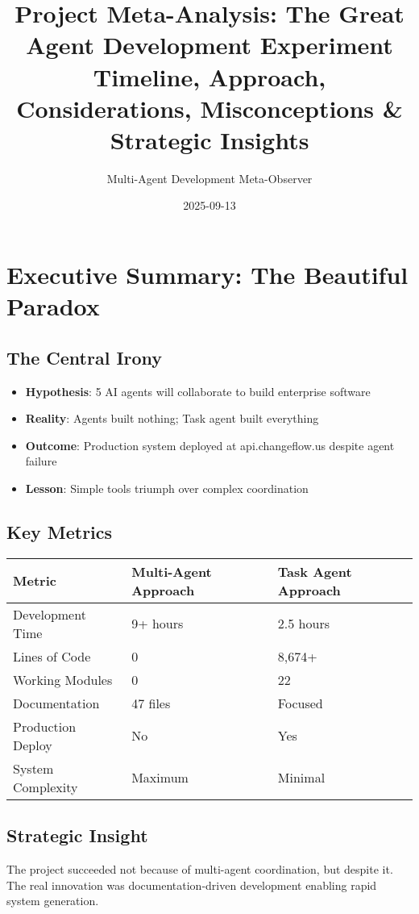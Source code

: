 \documentclass[11pt]{article}
\author{Multi-Agent Development Meta-Observer}
\date{2025-09-13}
\title{Project Meta-Analysis: The Great Agent Development Experiment\\\medskip
\large Timeline, Approach, Considerations, Misconceptions \& Strategic Insights}
\begin{document}
\maketitle
\tableofcontents

\section{Executive Summary: The Beautiful Paradox}
\label{sec:org606e2f9}

\subsection{The Central Irony}
\label{sec:org1a980ad}
\begin{itemize}
\item \textbf{\textbf{Hypothesis}}: 5 AI agents will collaborate to build enterprise software
\item \textbf{\textbf{Reality}}: Agents built nothing; Task agent built everything
\item \textbf{\textbf{Outcome}}: Production system deployed at api.changeflow.us despite agent failure
\item \textbf{\textbf{Lesson}}: Simple tools triumph over complex coordination
\end{itemize}
\subsection{Key Metrics}
\label{sec:org3f25f1b}
\begin{center}
\begin{tabular}{lll}
Metric & Multi-Agent Approach & Task Agent Approach\\
\hline
Development Time & 9+ hours & 2.5 hours\\
Lines of Code & 0 & 8,674+\\
Working Modules & 0 & 22\\
Documentation & 47 files & Focused\\
Production Deploy & No & Yes\\
System Complexity & Maximum & Minimal\\
\end{tabular}
\end{center}
\subsection{Strategic Insight}
\label{sec:org53a7d25}
The project succeeded not because of multi-agent coordination, but despite it. The real innovation was documentation-driven development enabling rapid system generation.
\end{document}
